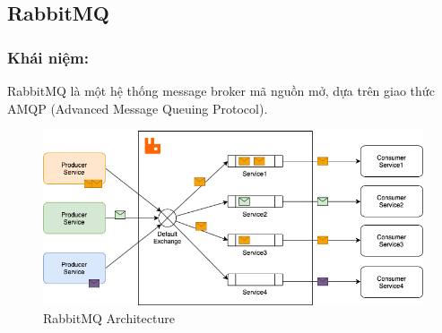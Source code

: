 \subsection{RabbitMQ}
\subsubsection{Khái niệm:}
\indent RabbitMQ là một hệ thống message broker mã nguồn mở, dựa trên giao thức AMQP (Advanced Message Queuing Protocol).
 \begin{figure}[H]
    \begin{center}
    \includegraphics[scale = 0.5]{images/phat/rabbitMQ.png}
    \vspace*{7mm}
    \caption{RabbitMQ Architecture}
    \end{center}
    \label{}
\end{figure}
